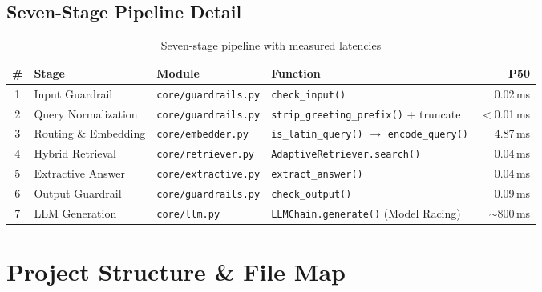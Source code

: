 \documentclass[12pt,a4paper]{article}
\begin{document}
\subsection{Seven-Stage Pipeline Detail}

\begin{table}[H]
\centering
\small
\begin{tabularx}{\textwidth}{c l l X r}
\toprule
\textbf{\#} & \textbf{Stage} & \textbf{Module} & \textbf{Function} & \textbf{P50} \\
\midrule
1 & Input Guardrail     & \texttt{core/guardrails.py} & \texttt{check\_input()}                    & 0.02\,ms \\
2 & Query Normalization & \texttt{core/guardrails.py} & \texttt{strip\_greeting\_prefix()} + truncate & $<$0.01\,ms \\
3 & Routing \& Embedding & \texttt{core/embedder.py}  & \texttt{is\_latin\_query()} $\to$ \texttt{encode\_query()} & 4.87\,ms \\
4 & Hybrid Retrieval    & \texttt{core/retriever.py}  & \texttt{AdaptiveRetriever.search()}        & 0.04\,ms \\
5 & Extractive Answer   & \texttt{core/extractive.py} & \texttt{extract\_answer()}                 & 0.04\,ms \\
6 & Output Guardrail    & \texttt{core/guardrails.py} & \texttt{check\_output()}                   & 0.09\,ms \\
7 & LLM Generation      & \texttt{core/llm.py}        & \texttt{LLMChain.generate()} (Model Racing)& $\sim$800\,ms \\
\bottomrule
\end{tabularx}
\caption{Seven-stage pipeline with measured latencies}
\end{table}


\section{Project Structure \& File Map}
\end{document}
